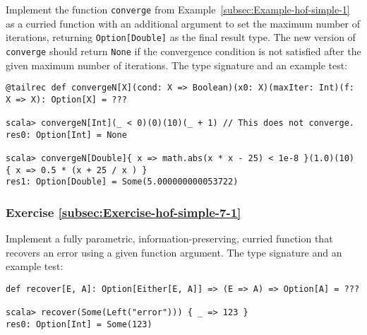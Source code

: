 Implement the function \lstinline!converge! from Example~\ref{subsec:Example-hof-simple-1}
as a curried function with an additional argument to set the maximum
number of iterations, returning \lstinline!Option[Double]! as the
final result type. The new version of \lstinline!converge! should
return \lstinline!None! if the convergence condition is not satisfied
after the given maximum number of iterations. The type signature and
an example test:
\begin{lstlisting}
@tailrec def convergeN[X](cond: X => Boolean)(x0: X)(maxIter: Int)(f: X => X): Option[X] = ???

scala> convergeN[Int](_ < 0)(0)(10)(_ + 1) // This does not converge.
res0: Option[Int] = None

scala> convergeN[Double]{ x => math.abs(x * x - 25) < 1e-8 }(1.0)(10) { x => 0.5 * (x + 25 / x ) }
res1: Option[Double] = Some(5.000000000053722)
\end{lstlisting}
\begin{comment}
Solution:
\begin{lstlisting}
@tailrec def convergeN[X](p: X => Boolean)(x:X)(m:Int)(f: X => X): Option[X] =  {
              if (m <= 0) None
              else if (p(x)) Some(x) else converge(p)(f(x))(m-1)(f)             } // Defining as def convergeN[X]: (X => Boolean) => X => Int => (X => X) => Option[X] = ??? will break tail recursion!
\end{lstlisting}
\end{comment}


\subsubsection{Exercise \label{subsec:Exercise-hof-simple-7-1}\ref{subsec:Exercise-hof-simple-7-1}}

Implement a fully parametric, information-preserving, curried function
that recovers an error using a given function argument. The type signature
and an example test:
\begin{lstlisting}
def recover[E, A]: Option[Either[E, A]] => (E => A) => Option[A] = ???

scala> recover(Some(Left("error"))) { _ => 123 }
res0: Option[Int] = Some(123)
\end{lstlisting}
\begin{comment}
Solution:

\begin{lstlisting}
def recover[E, A]: Option[Either[E, A]] => (E => A) => Option[A] = {
  case None => _ => None
  case Some(Right(a)) => _ => Some(a)
  case Some(Left(e)) => f => Some(f(e))
}
\end{lstlisting}
\end{comment}


